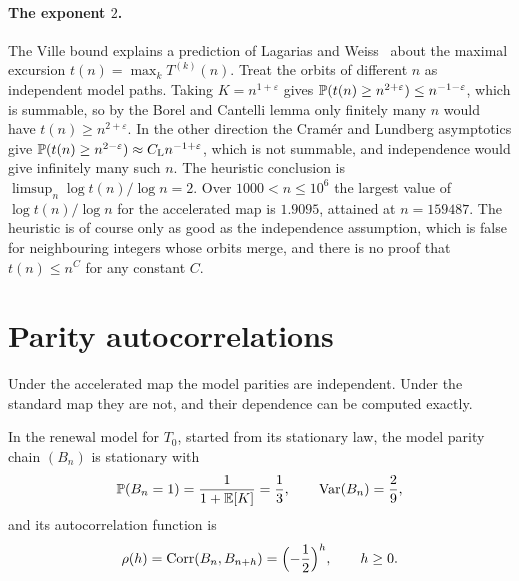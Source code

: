 \paragraph{The exponent $2$.} The Ville bound explains a prediction of
Lagarias and Weiss~\cite{lagarias1992} about the maximal excursion
$t(n)=\max_kT^{(k)}(n)$. Treat the orbits of different $n$ as independent
model paths. Taking $K=n^{1+\varepsilon}$ gives
$\mathbb{P}(t(n)\geq n^{2+\varepsilon})\le n^{-1-\varepsilon}$, which is summable,
so by the Borel and Cantelli lemma only finitely many $n$ would have
$t(n)\geq n^{2+\varepsilon}$. In the other direction the Cram\'er and Lundberg
asymptotics give $\mathbb{P}(t(n)\geq n^{2-\varepsilon})\approx C_{\mathrm L}n^{-1+\varepsilon}$,
which is not summable, and independence would give infinitely many such $n$.
The heuristic conclusion is $\limsup_n\log t(n)/\log n=2$. Over
$1000<n\le10^6$ the largest value of $\log t(n)/\log n$ for the accelerated map
is $1.9095$, attained at $n=159487$. The heuristic is of course only as good
as the independence assumption, which is false for neighbouring integers whose
orbits merge, and there is no proof that $t(n)\le n^{C}$ for any constant $C$.

\section{Parity autocorrelations}\label{sec:ch3:autocorr}

Under the accelerated map the model parities are independent. Under the
standard map they are not, and their dependence can be computed exactly.

\begin{proposition}\label{thm:autocorr}
In the renewal model for $T_0$, started from its stationary law, the model
parity chain $(B_n)$ is stationary with
\[
  \mathbb{P}(B_n=1)=\frac{1}{1+\mathbb{E}[K]}=\frac13,\qquad\operatorname{Var}(B_n)=\frac29,
\]
and its autocorrelation function is
\begin{equation}\label{eq:ch3:rhoh}
  \rho(h)=\mathrm{Corr}(B_n,B_{n+h})=\Bigl(-\frac12\Bigr)^{h},\qquad h\geq0 .
\end{equation}
\end{proposition}

